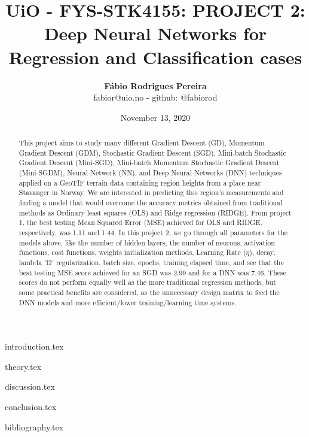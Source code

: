 \documentclass{article}
\title{UiO - FYS-STK4155: PROJECT 2: Deep Neural Networks for Regression and Classification cases}
\author{\textbf{Fábio Rodrigues Pereira} \\ \small fabior@uio.no - github: @fabiorod}
\date{November 13, 2020}
\begin{document}
\maketitle
\begin{abstract}
\noindent This project aims to study many different Gradient Descent (GD), Momentum Gradient Descent (GDM), Stochastic Gradient Descent (SGD), Mini-batch Stochastic Gradient Descent (Mini-SGD), Mini-batch Momentum Stochastic Gradient Descent (Mini-SGDM), Neural Network (NN), and Deep Neural Networks (DNN) techniques applied on a GeoTIF terrain data containing region heights from a place near Stavanger in Norway. We are interested in predicting this region's measurements and finding a model that would overcome the accuracy metrics obtained from traditional methods as Ordinary least squares (OLS) and Ridge regression (RIDGE). From project 1, the best testing Mean Squared Error (MSE) achieved for OLS and RIDGE, respectively, was 1.11 and 1.44. In this project 2, we go through all parameters for the models above, like the number of hidden layers, the number of neurons, activation functions, cost functions, weights initialization methods, Learning Rate ($\eta$), decay, lambda 'l2' regularization, batch size, epochs, training elapsed time, and see that the best testing MSE score achieved for an SGD was 2.99 and for a DNN was 7.46. These scores do not perform equally well as the more traditional regression methods, but some practical benefits are considered, as the unnecessary design matrix to feed the DNN models and more efficient/lower training/learning time systems.
\end{abstract}

\clearpage
\thispagestyle{empty}

\tableofcontents

\clearpage
\thispagestyle{empty}

{introduction.tex}

\clearpage
\thispagestyle{empty}

{theory.tex}

\clearpage
\thispagestyle{empty}

{discussion.tex}

\clearpage
\thispagestyle{empty}

{conclusion.tex}

\clearpage
\thispagestyle{empty}

{bibliography.tex}
\end{document}
